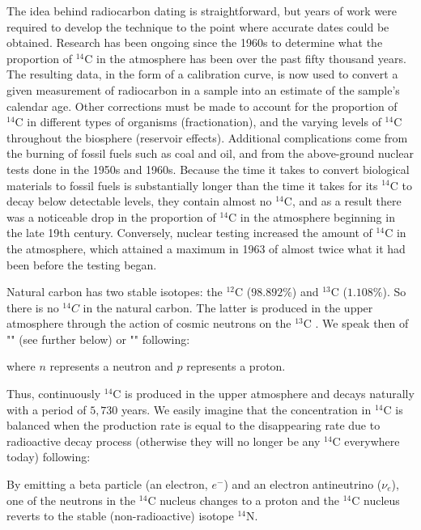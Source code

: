 	The idea behind radiocarbon dating is straightforward, but years of work were required to develop the technique to the point where accurate dates could be obtained. Research has been ongoing since the 1960s to determine what the proportion of $^{14}\mathrm{C}$ in the atmosphere has been over the past fifty thousand years. The resulting data, in the form of a calibration curve, is now used to convert a given measurement of radiocarbon in a sample into an estimate of the sample's calendar age. Other corrections must be made to account for the proportion of $^{14}\mathrm{C}$ in different types of organisms (fractionation), and the varying levels of $^{14}\mathrm{C}$ throughout the biosphere (reservoir effects). Additional complications come from the burning of fossil fuels such as coal and oil, and from the above-ground nuclear tests done in the 1950s and 1960s. Because the time it takes to convert biological materials to fossil fuels is substantially longer than the time it takes for its $^{14}\mathrm{C}$ to decay below detectable levels, they contain almost no $^{14}\mathrm{C}$, and as a result there was a noticeable drop in the proportion of $^{14}\mathrm{C}$ in the atmosphere beginning in the late 19th century. Conversely, nuclear testing increased the amount of $^{14}\mathrm{C}$ in the atmosphere, which attained a maximum in 1963 of almost twice what it had been before the testing began.
	
	Natural carbon has two stable isotopes: the $^{12}\mathrm{C}$ ($98.892\%$) and $^{13}\mathrm{C}$ ($1.108\%$). So there is no $^{14}C$ in the natural carbon. The latter is produced in the upper atmosphere through the action of cosmic neutrons on the $^{13}\mathrm{C}$ . We speak then of "" (see further below) or "" following:
	
	where $n$ represents a neutron and $p$ represents a proton. 
	
	Thus, continuously $^{14} \mathrm{C}$ is produced in the upper atmosphere and decays naturally with a period of $5,730$ years. We easily imagine that the concentration in $^{14}\mathrm{C}$ is balanced when the production rate is equal to the disappearing rate due to radioactive decay process (otherwise they will no longer be any $^{14}\mathrm{C}$ everywhere today) following:
	
	By emitting a beta particle (an electron, $e^{-}$) and an electron antineutrino ($\nu_e$), one of the neutrons in the $^{14}\mathrm{C}$ nucleus changes to a proton and the $^{14}\mathrm{C}$  nucleus reverts to the stable (non-radioactive) isotope $^{14}\mathrm{N}$.
	
